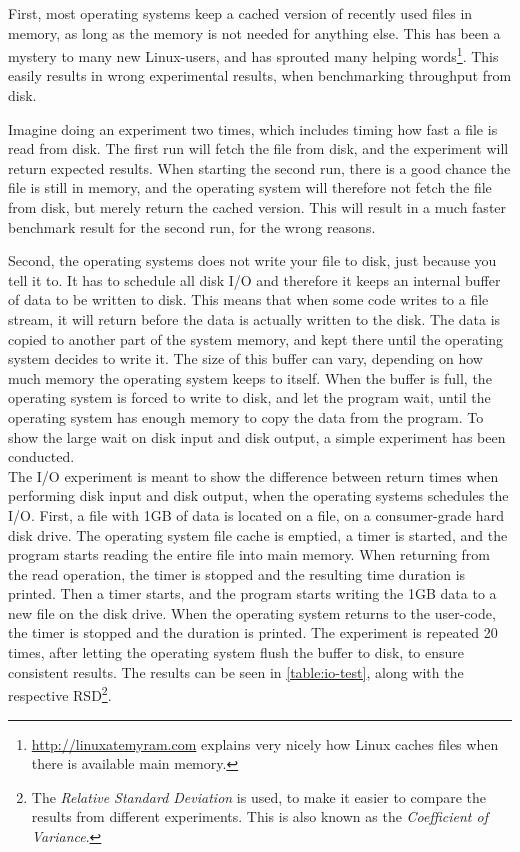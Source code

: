 \documentclass[a4paper]{article}
\begin{document}
First, most operating systems keep a cached version of recently used files in memory, as long as the memory is not needed for anything else. This has been a mystery to many new Linux-users, and has sprouted many helping words\footnote{\url{http://linuxatemyram.com} explains very nicely how Linux caches files when there is available main memory.}. This easily results in wrong experimental results, when benchmarking throughput from disk.

Imagine doing an experiment two times, which includes timing how fast a file is read from disk. The first run will fetch the file from disk, and the experiment will return expected results. When starting the second run, there is a good chance the file is still in memory, and the operating system will therefore not fetch the file from disk, but merely return the cached version. This will result in a much faster benchmark result for the second run, for the wrong reasons.

Second, the operating systems does not write your file to disk, just because you tell it to. It has to schedule all disk I/O and therefore it keeps an internal buffer of data to be written to disk. This means that when some code writes to a file stream, it will return before the data is actually written to the disk. The data is copied to another part of the system memory, and kept there until the operating system decides to write it. The size of this buffer can vary, depending on how much memory the operating system keeps to itself. When the buffer is full, the operating system is forced to write to disk, and let the program wait, until the operating system has enough memory to copy the data from the program. To show the large wait on disk input and disk output, a simple experiment has been conducted.\\

The I/O experiment is meant to show the difference between return times when performing disk input and disk output, when the operating systems schedules the I/O. First, a file with 1GB of data is located on a file, on a consumer-grade hard disk drive. The operating system file cache is emptied, a timer is started, and the program starts reading the entire file into main memory. When returning from the read operation, the timer is stopped and the resulting time duration is printed. Then a timer starts, and the program starts writing the 1GB data to a new file on the disk drive. When the operating system returns to the user-code, the timer is stopped and the duration is printed. The experiment is repeated 20 times, after letting the operating system flush the buffer to disk, to ensure consistent results. The results can be seen in \autoref{table:io-test}, along with the respective RSD\footnote{The \textit{Relative Standard Deviation} is used, to make it easier to compare the results from different experiments. This is also known as the \textit{Coefficient of Variance}.}.\\
\end{document}
